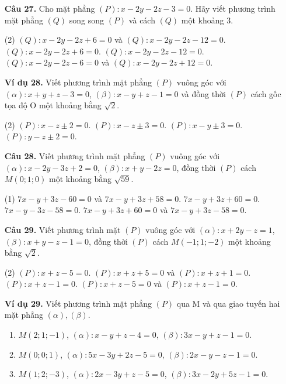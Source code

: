 \documentclass[12pt, a4paper]{article}
\begin{document}
\begin{enumerate}[label=\textbf{\arabic*.}, wide=0pt, leftmargin=*]
    \item[\textbf{Câu 27.}] Cho mặt phẳng \((P): x-2y-2z-3=0\). Hãy viết phương trình mặt phẳng \((Q)\) song song \((P)\) và cách \((Q)\) một khoảng 3.
    \begin{tasks}(2)
        \task \((Q): x-2y-2z+6=0\) và \((Q): x-2y-2z-12=0\).
        \task \((Q): x-2y-2z+6=0\).
        \task \((Q): x-2y-2z-12=0\).
        \task \((Q): x-2y-2z-6=0\) và \((Q): x-2y-2z+12=0\).
    \end{tasks}
    
    \item[\textbf{Ví dụ 28.}] Viết phương trình mặt phẳng \((P)\) vuông góc với \((\alpha): x+y+z-3=0\), \((\beta): x-y+z-1=0\) và đồng thời \((P)\) cách gốc tọa độ O một khoảng bằng \(\sqrt{2}\).
    \begin{tasks}(2)
        \task \((P): x-z \pm 2 = 0\).
        \task \((P): x-z \pm 3 = 0\).
        \task \((P): x-y \pm 3 = 0\).
        \task \((P): y-z \pm 2 = 0\).
    \end{tasks}
    
    \item[\textbf{Câu 28.}] Viết phương trình mặt phẳng \((P)\) vuông góc với \((\alpha): x-2y-3z+2=0\), \((\beta): x+y-2z=0\), đồng thời \((P)\) cách \(M(0;1;0)\) một khoảng bằng \(\sqrt{59}\).
    \begin{tasks}[label-width=1em](1)
        \task \(7x-y+3z-60=0\) và \(7x-y+3z+58=0\).
        \task \(7x-y+3z+60=0\).
        \task \(7x-y-3z-58=0\).
        \task \(7x-y+3z+60=0\) và \(7x-y+3z-58=0\).
    \end{tasks}
    
    
    \item[\textbf{Câu 29.}] Viết phương trình mặt \((P)\) vuông góc với \((\alpha): x+2y-z=1\), \((\beta): x+y-z-1=0\), đồng thời \((P)\) cách \(M(-1;1;-2)\) một khoảng bằng \(\sqrt{2}\).
    \begin{tasks}(2)
        \task \((P): x+z-5=0\).
        \task \((P): x+z+5=0\) và \((P): x+z+1=0\).
        \task \((P): x+z-1=0\).
        \task \((P): x+z-5=0\) và \((P): x+z-1=0\).
    \end{tasks}

    \item[\textbf{Ví dụ 29.}] Viết phương trình mặt phẳng \((P)\) qua M và qua giao tuyến hai mặt phẳng \((\alpha), (\beta)\).
    \begin{enumerate}[label=\alph*)]
        \item \(M(2;1;-1)\), \((\alpha): x-y+z-4=0\), \((\beta): 3x-y+z-1=0\).
        \item \(M(0;0;1)\), \((\alpha): 5x-3y+2z-5=0\), \((\beta): 2x-y-z-1=0\).
        \item \(M(1;2;-3)\), \((\alpha): 2x-3y+z-5=0\), \((\beta): 3x-2y+5z-1=0\).
    \end{enumerate}


\end{enumerate}
\end{document}
